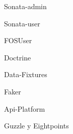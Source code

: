 \item Sonata-admin
\item Sonata-user
\item FOSUser
\item Doctrine
\item Data-Fixtures
\item Faker
\item Api-Platform
\item Guzzle y Eightpoints
